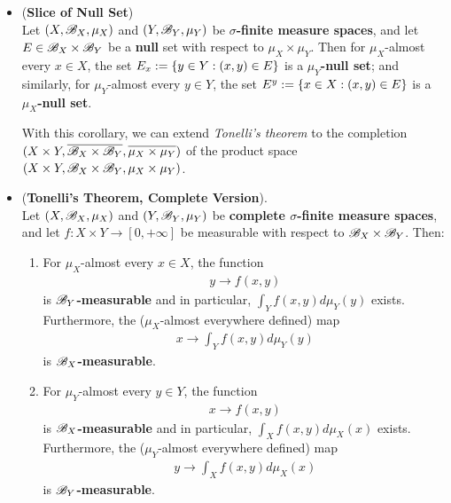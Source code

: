 \documentclass[11pt]{article}
\begin{document}
\begin{itemize}
\item \begin{corollary} (\textbf{Slice of Null Set})\citep{tao2011introduction}\\
Let $(X, {\mathscr B}_X, \mu_X)$ and $(Y, {\mathscr B}_Y, \mu_Y)$ be \textbf{$\sigma$-finite measure spaces}, and let $E \in {\mathscr B}_X \times {\mathscr B}_Y$ be a \textbf{null} set with respect to $\mu_X \times \mu_Y$. Then for $\mu_X$-almost every  $x \in X$, the set $E_x := \left\{y \in Y: (x, y) \in E\right\}$ is a \textbf{$\mu_Y$-null set}; and similarly, for $\mu_Y$-almost every $y \in Y$, the set $E^y := \left\{x \in X: (x, y) \in E\right\}$ is a \textbf{$\mu_X$-null set}.
\end{corollary}

With this corollary, we can extend \emph{Tonelli's theorem} to the completion $(X \times Y, \overline{{\mathscr B}_X \times {\mathscr B}_Y},  \overline{\mu_X \times \mu_Y})$ of the product space $(X \times Y, {\mathscr B}_X \times {\mathscr B}_Y,  \mu_X \times \mu_Y)$.

\item \begin{theorem}  (\textbf{Tonelli's Theorem, Complete Version}).   \citep{tao2011introduction}\\
Let $(X, {\mathscr B}_X, \mu_X)$ and $(Y, {\mathscr B}_Y, \mu_Y)$  be \textbf{complete $\sigma$-finite measure spaces}, and let  $f : X \times Y \to [0, +\infty]$ be measurable with respect to ${\mathscr B}_X \times {\mathscr B}_Y$. Then:
\begin{enumerate}
\item For $\mu_X$-almost every  $x \in X$,  the function
\begin{align*}
y \to f(x,y)
\end{align*} is \textbf{${\mathscr B}_Y$-measurable} and in particular, $\int_Y f(x,y) d\mu_Y(y)$ exists. Furthermore, the ($\mu_X$-almost everywhere defined) map
\begin{align*}
x \to \int_Y f(x,y) d\mu_Y(y)
\end{align*} is \textbf{${\mathscr B}_X$-measurable}.

\item  For $\mu_Y$-almost every  $y \in Y$,  the function
\begin{align*}
x \to f(x,y)
\end{align*} is \textbf{${\mathscr B}_X$-measurable} and in particular, $\int_X f(x,y) d\mu_X(x)$ exists. Furthermore, the ($\mu_Y$-almost everywhere defined) map
\begin{align*}
y \to \int_X f(x,y) d\mu_X(x)
\end{align*} is \textbf{${\mathscr B}_Y$-measurable}.


\end{enumerate}
\end{theorem}
\end{itemize}
\end{document}
